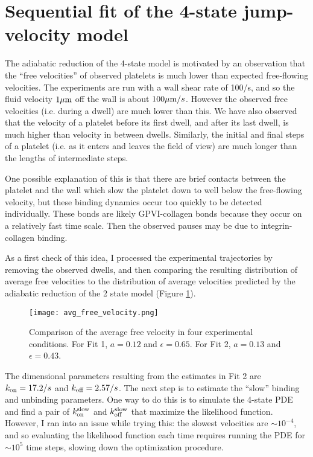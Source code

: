 \documentclass{article}
\newcommand{\tn}{\textnormal}
\begin{document}
\newpage

\section{Sequential fit of the 4-state jump-velocity model}
\label{sec:sequential-fit-4}

The adiabatic reduction of the 4-state model is motivated by an
observation that the ``free velocities'' of observed platelets is much
lower than expected free-flowing velocities. The experiments are run
with a wall shear rate of 100/s, and so the fluid velocity
$1 \mu\tn{m}$ off the wall is about $100 \mu\tn{m}/s$. However the
observed free velocities (i.e. during a dwell) are much lower than
this. We have also observed that the velocity of a platelet before its
first dwell, and after its last dwell, is much higher than velocity in
between dwells. Similarly, the initial and final steps of a platelet
(i.e. as it enters and leaves the field of view) are much longer than
the lengths of intermediate steps.

One possible explanation of this is that there are brief contacts
between the platelet and the wall which slow the platelet down to well
below the free-flowing velocity, but these binding dynamics occur too
quickly to be detected individually. These bonds are likely
GPVI-collagen bonds because they occur on a relatively fast time
scale. Then the observed pauses may be due to integrin-collagen
binding.

As a first check of this idea, I processed the experimental
trajectories by removing the observed dwells, and then comparing the
resulting distribution of average free velocities to the distribution
of average velocities predicted by the adiabatic reduction of the 2
state model (Figure \ref{fig:avg-free-vel}).

\begin{figure}
  \centering
  \texttt{[image: avg\_free\_velocity.png]}
  \caption{Comparison of the average free velocity in four
    experimental conditions. For Fit 1, $a = 0.12$ and $\epsilon =
    0.65$. For Fit 2, $a = 0.13$ and $\epsilon = 0.43$.}
  \label{fig:avg-free-vel}
\end{figure}

The dimensional parameters resulting from the estimates in Fit 2 are
$k_\tn{on} = 17.2 / s$ and $k_\tn{off} = 2.57 / s$. The next step is
to estimate the ``slow'' binding and unbinding parameters. One way to
do this is to simulate the 4-state PDE and find a pair of
$k_\tn{on}^\tn{slow}$ and $k_\tn{off}^\tn{slow}$ that maximize the
likelihood function. However, I ran into an issue while trying this:
the slowest velocities are $\sim 10^{-4}$, and so evaluating the
likelihood function each time requires running the PDE for $\sim 10^5$
time steps, slowing down the optimization procedure.
\end{document}

